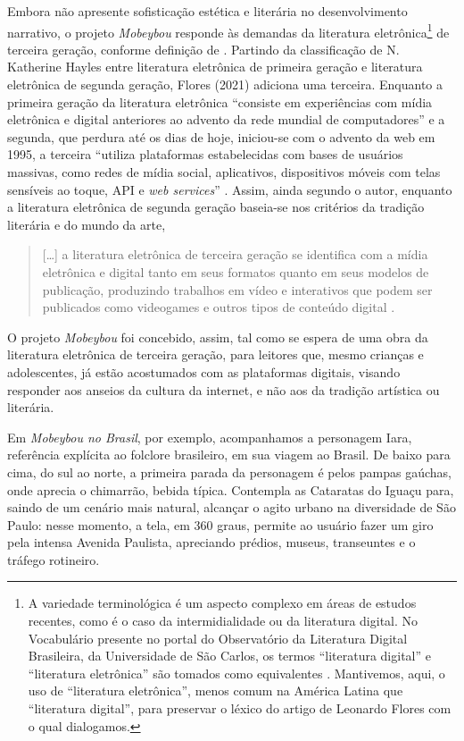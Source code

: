 \documentclass[portuguese]{textolivre}
\begin{document}
Embora não apresente sofisticação estética e literária no desenvolvimento
narrativo, o projeto \textit{Mobeybou} responde às demandas da literatura
eletrônica\footnote{
    A variedade terminológica é um aspecto complexo em áreas de
    estudos recentes, como é o caso da intermidialidade ou da literatura digital.
    No Vocabulário presente no portal do Observatório da Literatura Digital
    Brasileira, da Universidade de São Carlos, os termos “literatura digital” e
    “literatura eletrônica” são tomados como equivalentes
    \cite{antunes_literatura_2024}. Mantivemos, aqui, o uso de “literatura
    eletrônica”, menos comum na América Latina que “literatura digital”, para
    preservar o léxico do artigo de Leonardo Flores com o qual dialogamos.} 
de terceira geração, conforme definição de \textcite{flores_literatura_2021}.
Partindo da classificação de N. Katherine Hayles entre literatura eletrônica de
primeira geração e literatura eletrônica de segunda geração, Flores (2021)
adiciona uma terceira. Enquanto a primeira geração da literatura eletrônica
“consiste em experiências com mídia eletrônica e digital anteriores ao advento
da rede mundial de computadores” \cite[p. 358]{flores_literatura_2021} e a
segunda, que perdura até os dias de hoje, iniciou-se com o advento da web em
1995, a terceira “utiliza plataformas estabelecidas com bases de usuários
massivas, como redes de mídia social, aplicativos, dispositivos móveis com
telas sensíveis ao toque, API e \textit{web services}”
\cite[p.~358]{flores_literatura_2021}. Assim, ainda segundo o autor, enquanto a
literatura eletrônica de segunda geração baseia-se nos critérios da tradição
literária e do mundo da arte,
\begin{quote}
[…] a literatura eletrônica de terceira geração se identifica com a mídia
eletrônica e digital tanto em seus formatos quanto em seus modelos de
publicação, produzindo trabalhos em vídeo e interativos que podem ser
publicados como videogames e outros tipos de conteúdo digital
\cite[p.~367]{flores_literatura_2021}.
\end{quote}


O projeto \textit{Mobeybou} foi concebido, assim, tal como se espera de uma
obra da literatura eletrônica de terceira geração, para leitores que, mesmo
crianças e adolescentes, já estão acostumados com as plataformas digitais,
visando responder aos anseios da cultura da internet, e não aos da tradição
artística ou literária. 

Em \textit{Mobeybou no Brasil}, por exemplo, acompanhamos a personagem Iara,
referência explícita ao folclore brasileiro, em sua viagem ao Brasil. De baixo
para cima, do sul ao norte, a primeira parada da personagem é pelos pampas
gaúchas, onde aprecia o chimarrão, bebida típica. Contempla as Cataratas do
Iguaçu para, saindo de um cenário mais natural, alcançar o agito urbano na
diversidade de São Paulo: nesse momento, a tela, em 360 graus, permite ao
usuário fazer um giro pela intensa Avenida Paulista, apreciando prédios,
museus, transeuntes e o tráfego rotineiro. 
\end{document}
